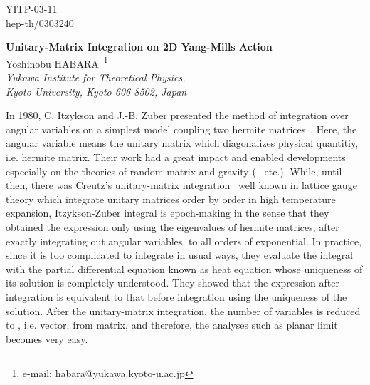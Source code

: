 \documentclass[a4paper,12pt]{article}
\begin{document}
\begin{flushright}
	YITP-03-11 \\
	hep-th/0303240
\end{flushright}

\vspace{2.5cm}

\begin{center}
{\Large\bf Unitary-Matrix Integration on 2D Yang-Mills Action}\\
\bigskip
\vspace{1.5cm}
{\large Yoshinobu H}ABARA~\footnote{e-mail: habara@yukawa.kyoto-u.ac.jp}\\
\vspace{0.5cm}
{\it  Yukawa Institute for Theoretical Physics,}\\
{\it  Kyoto University, Kyoto 606-8502, Japan}
\end{center}

\vspace{1cm}

\begin{abstract}
Using the idea of Itzykson-Zuber integral, unitary-matrix integration of 2D Yang-Mills action is presented. The uniqueness of the solution of heat equation enables us to integrate out the unitary-matrix parts of hermite matrices and to obtain the expression of integration over vectors, also in this case. 
\end{abstract}

\vspace{2.5cm}


\vskip 0.5cm

In 1980, C. Itzykson and J.-B. Zuber presented the method of integration over angular variables on a simplest model coupling two hermite matrices~\cite{itz}. Here, the angular variable means the unitary matrix which diagonalizes physical quantitiy, i.e. \coordHE{} hermite matrix. Their work had a great impact and enabled developments especially on the theories of random matrix and \coordHE{} gravity (~\cite{mehta} etc.). While, until then, there was Creutz's unitary-matrix integration~\cite{creutz} well known in lattice gauge theory which integrate unitary matrices order by order in high temperature expansion, Itzykson-Zuber integral is epoch-making in the sense that they obtained the expression only using the eigenvalues of hermite matrices, after exactly integrating out angular variables, to all orders of exponential. In practice, since it is too complicated to integrate in usual ways, they evaluate the integral with the partial differential equation known as heat equation whose uniqueness of its solution is completely understood. They showed that the expression after integration is equivalent to that before integration using the uniqueness of the solution. After the unitary-matrix integration, the number of variables is reduced to \coordHE{}, i.e. vector, from \coordHE{} matrix, and therefore, the analyses such as \coordHE{} planar limit becomes very easy.
\end{document}

